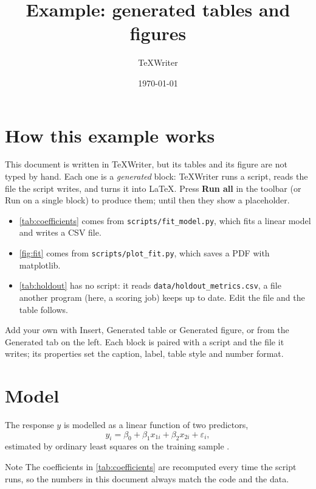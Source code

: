 \documentclass[11pt,oneside,letterpaper]{article}
\title{Example: generated tables and figures}
\author{TeXWriter}
\date{\today}
\begin{document}
\maketitle

\section{How this example works}\label{sec:how}
This document is written in TeXWriter, but its tables and its figure are not typed by hand.
Each one is a \emph{generated} block: TeXWriter runs a script, reads the file the script
writes, and turns it into LaTeX. Press \textbf{Run all} in the toolbar (or Run on a single
block) to produce them; until then they show a placeholder.

\begin{itemize}
  \item \autoref{tab:coefficients} comes from \texttt{scripts/fit\_model.py}, which fits a
  linear model and writes a CSV file.
  \item \autoref{fig:fit} comes from \texttt{scripts/plot\_fit.py}, which saves a PDF with
  matplotlib.
  \item \autoref{tab:holdout} has no script: it reads \texttt{data/holdout\_metrics.csv},
  a file another program (here, a scoring job) keeps up to date. Edit the file and the table
  follows.
\end{itemize}

Add your own with Insert, Generated table or Generated figure, or from the Generated tab on
the left. Each block is paired with a script and the file it writes; its properties set the
caption, label, table style and number format.

\section{Model}\label{sec:model}
The response $y$ is modelled as a linear function of two predictors,
\begin{equation}\label{eq:model}
  y_i = \beta_0 + \beta_1 x_{1i} + \beta_2 x_{2i} + \varepsilon_i ,
\end{equation}
estimated by ordinary least squares on the training sample \citep{hastie2009}.



\begin{texwritercallout}{Note}
The coefficients in \autoref{tab:coefficients} are recomputed every time the script runs, so
the numbers in this document always match the code and the data.
\end{texwritercallout}
\end{document}
